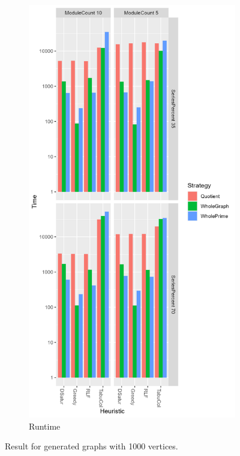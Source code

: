 \documentclass[a4paper]{article}
\begin{document}
\begin{figure}[p]
\begin{subfigure}{.4\paperwidth}
    \end{subfigure}%
    \begin{subfigure}{.4\paperwidth}
        \includegraphics[width=\columnwidth]{Tables/1000Time.png}
      \caption{Runtime}
      \label{fig:1000t}
    \end{subfigure}
\caption{Result for generated graphs with 1000 vertices. \facfigdesc }
\label{fig:1000}
\end{figure}
\end{document}
